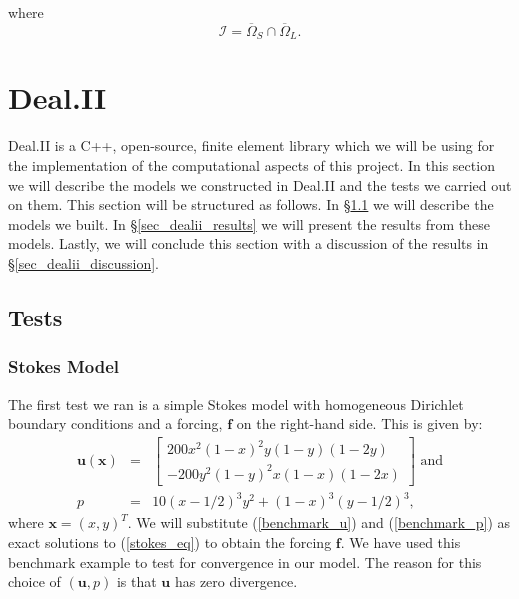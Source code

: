 \documentclass[12pt,a4paper]{article}
\theoremstyle{definition}
\begin{document}
where 
\begin{equation}
\mathcal{I}=\overline{\Omega}_S\cap\overline{\Omega}_L.
\end{equation}


\section{Deal.II}\label{sec_numerics}
Deal.II is a C++, open-source, finite element library which we will be using for the implementation of the computational aspects of this project.   In this section we will describe the models we constructed in Deal.II and the tests we carried out on them.  This section will be structured as follows.  In  \S \ref{sec_dealii_tests} we will describe the models we built.  In \S \ref{sec_dealii_results} we will present the results from these models.  Lastly, we will conclude this section with a discussion of the results in \S \ref{sec_dealii_discussion}.  
\subsection{Tests}\label{sec_dealii_tests}
\subsubsection{Stokes Model}\label{sec_test_stokes}
The first test we ran is a simple Stokes model with homogeneous Dirichlet boundary conditions and a forcing, $\textbf{f}$ on the right-hand side.  This is given by:
\begin{eqnarray}
\label{benchmark_u}
\textbf{u}\left(\textbf{x}\right)&=&\begin{bmatrix}
200x^2\left(1-x\right)^2y\left(1-y\right)\left(1-2y\right)  \\
-200y^2\left(1-y\right)^2x\left(1-x\right)\left(1-2x\right)  
\end{bmatrix} \text{ and}\\\label{benchmark_p}
p &=& 10\left(x-1/2\right)^3y^2+\left(1-x\right)^3\left(y-1/2\right)^3,
\end{eqnarray}
where $\textbf{x}=\left(x,y\right)^T$.    We will substitute (\ref{benchmark_u}) and (\ref{benchmark_p}) as exact solutions to (\ref{stokes_eq}) to obtain the forcing $\textbf{f}$.  We have used this benchmark example to test for convergence in our model.  The reason for this choice of $\left(\textbf{u},p\right)$ is that $\textbf{u}$ has zero divergence.
\end{document}
